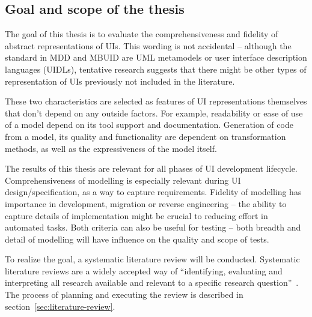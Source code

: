 \subsection{Goal and scope of the thesis}\label{subsec:goal-and-scope}
The goal of this thesis is to evaluate the comprehensiveness and fidelity of abstract representations of UIs.
This wording is not accidental – although the standard in MDD and MBUID are UML metamodels or user interface description languages (UIDLs), tentative research suggests that there might be other types of representation of UIs previously not included in the literature.

These two characteristics are selected as features of UI representations themselves that don’t depend on any outside factors.
For example, readability or ease of use of a model depend on its tool support and documentation.
Generation of code from a model, its quality and functionality are dependent on transformation methods, as well as the expressiveness of the model itself.

The results of this thesis are relevant for all phases of UI development lifecycle.
Comprehensiveness of modelling is especially relevant during UI design/specification, as a way to capture requirements.
Fidelity of modelling has importance in development, migration or reverse engineering – the ability to capture details of implementation might be crucial to reducing effort in automated tasks.
Both criteria can also be useful for testing – both breadth and detail of modelling will have influence on the quality and scope of tests.

To realize the goal, a systematic literature review will be conducted.
Systematic literature reviews are a widely accepted way of \enquote{identifying, evaluating and interpreting all research available and relevant to a specific research question}~\cite{kitchenham_guidelines_2007}.
The process of planning and executing the review is described in section~\ref{sec:literature-review}.
